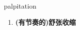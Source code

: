 
\begin{frame}
{\huge palpitation}
\begin{center}
\begin{enumerate}\Large
  \item \textbf{(有节奏的)舒张收缩}
\end{enumerate}
\end{center}
\end{frame}
